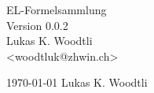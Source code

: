\begin{titlepage}
\vspace*{7cm}
\begin{center}
\Huge
EL-Formelsammlung\\
\vspace{1cm}
\large
Version 0.0.2\\
\vspace{2cm}
Lukas K. Woodtli\\
<woodtluk@zhwin.ch>\\
\end{center}
\normalsize
\vfill
\footnotesize\textcopyright \; \today \; Lukas K. Woodtli
\end{titlepage}
